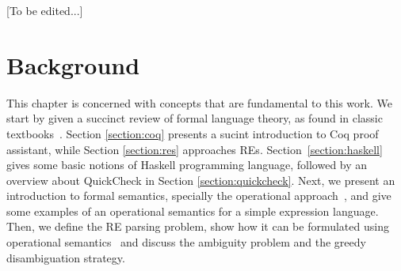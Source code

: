 \documentclass[oneside,12pt]{scrbook}
\theoremstyle{definition}
\theoremstyle{plain}
\theoremstyle{definition}
\begin{document}
[To be edited...] 




\chapter{Background}\label{chapter:background}

This chapter is concerned with concepts that are fundamental to this work. We start by given a succinct
review of formal language theory, as found in classic textbooks~\cite{Hopcroft2000}. Section \ref{section:coq} presents a sucint introduction to Coq proof assistant, while Section \ref{section:res} approaches REs. Section~\ref{section:haskell} gives some basic notions of Haskell programming language, followed by an overview about QuickCheck in Section \ref{section:quickcheck}. Next, we present an introduction to
formal semantics, specially the operational approach~\cite{Pierce2000}, and give some examples of an operational
semantics for a simple expression language. Then, we define the RE parsing problem, show how it can be
formulated using operational semantics~\cite{Rathnayake2011} and discuss the ambiguity problem and the greedy disambiguation strategy.
\end{document}
